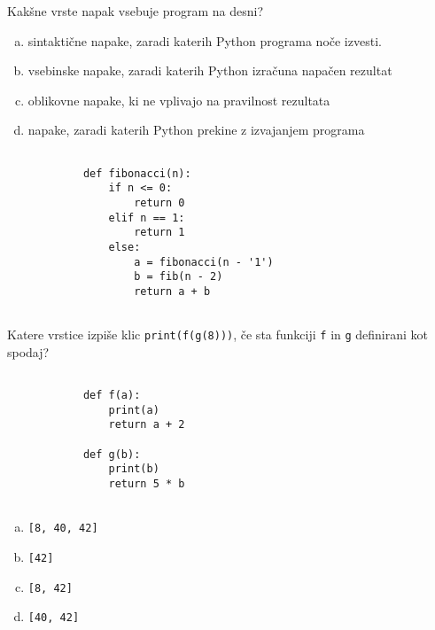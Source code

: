 \documentclass[arhiv, 10pt]{../izpit}
\newcommand{\inlinepy}[1]{\texttt{#1}}
\begin{document}
        \naloga*
        \begin{multicols}{2}
        \noindent
        Kakšne vrste napak vsebuje program na desni?

        \begin{enumerate}[(a)]
\item sintaktične napake, zaradi katerih Python programa noče izvesti.
\item vsebinske napake, zaradi katerih Python izračuna napačen rezultat
\item oblikovne napake, ki ne vplivajo na pravilnost rezultata
\item napake, zaradi katerih Python prekine z izvajanjem programa
\end{enumerate}

        \columnbreak

        \begin{verbatim}
        
            def fibonacci(n):
                if n <= 0:
                    return 0
                elif n == 1:
                    return 1
                else:
                    a = fibonacci(n - '1')
                    b = fib(n - 2)
                    return a + b
            
        \end{verbatim}

        \end{multicols}

    
        \naloga*
        Katere vrstice izpiše klic \inlinepy{print(f(g(8)))}, če sta funkciji \inlinepy{f} in \inlinepy{g} definirani kot spodaj?

        \begin{multicols}{2}
        \begin{verbatim}
        
            def f(a):
                print(a)
                return a + 2

            def g(b):
                print(b)
                return 5 * b
        
        \end{verbatim}

        \begin{enumerate}[(a)]
\item \inlinepy{[8, 40, 42]}
\item \inlinepy{[42]}
\item \inlinepy{[8, 42]}
\item \inlinepy{[40, 42]}
\end{enumerate}

        \end{multicols}
    
\end{document}
